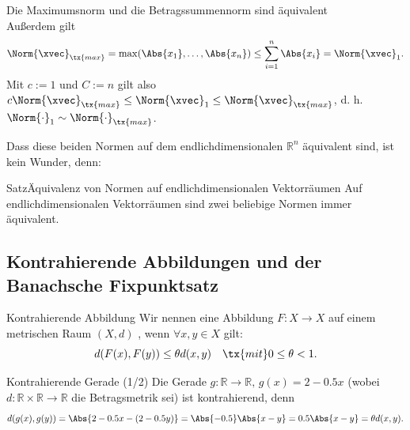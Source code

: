 \begin{Beispiel}
{Die Maximumsnorm und die Betragssummennorm sind äquivalent}
\\
Außerdem gilt
\begin{equation*}
    \Norm{\xvec}_\tx{max}=\max(\Abs{x_1},\ldots,\Abs{x_n})\leq\sum_{i=1}^n\Abs{x_i}=\Norm{\xvec}_1.
\end{equation*}
Mit $c:=1$ und $C:=n$ gilt also $c\Norm{\xvec}_\tx{max}\leq\Norm{\xvec}_1\leq\Norm{\xvec}_\tx{max}$, d. h. $\Norm{\cdot}_1\sim\Norm{\cdot}_\tx{max}$.
\end{Beispiel}
Dass diese beiden Normen auf dem endlichdimensionalen $\mathbb{R}^n$ äquivalent sind, ist kein Wunder, denn:
\begin{Satz}
{Satz}{Äquivalenz von Normen auf endlichdimensionalen Vektorräumen}
Auf endlichdimensionalen Vektorräumen sind zwei beliebige Normen immer äquivalent.
\end{Satz}

\subsection{Kontrahierende Abbildungen und der Banachsche Fixpunktsatz}
\begin{Def}
{Kontrahierende Abbildung}
Wir nennen eine Abbildung $F:X\to X$ auf einem metrischen Raum $(X,d)$ , wenn $\forall x,y\in X$ gilt:
\begin{equation*}
    d(F(x),F(y))\leq \theta d(x,y)\quad\tx{mit }0\leq\theta <1.
\end{equation*}
\end{Def}
\begin{Beispiel}
{Kontrahierende Gerade (1/2)}
Die Gerade $g:\mathbb{R}\to\mathbb{R},\,g(x)=2-0.5x$ (wobei $d:\mathbb{R}\times\mathbb{R}\to\mathbb{R}$ die Betragsmetrik sei) ist kontrahierend, denn
\begin{equation*}
    d(g(x),g(y))=\Abs{2-0.5x-(2-0.5y)}=\Abs{-0.5}\Abs{x-y}=0.5\Abs{x-y}=\theta d(x,y).
\end{equation*}
\end{Beispiel}

